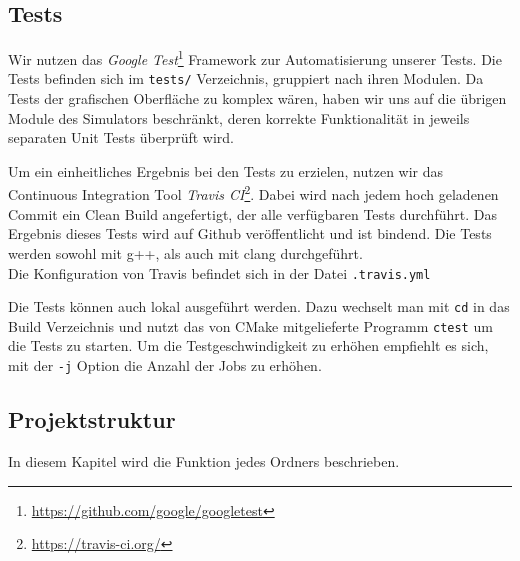 \subsection{Tests}

Wir nutzen das \emph{Google Test}\footnote{\url{https://github.com/google/googletest}} Framework
zur Automatisierung unserer Tests. Die Tests befinden sich im \texttt{tests/} Verzeichnis, gruppiert
nach ihren Modulen. Da Tests der grafischen Oberfläche zu komplex wären, haben wir uns auf die übrigen
Module des Simulators beschränkt, deren korrekte Funktionalität in jeweils separaten Unit Tests
überprüft wird.

Um ein einheitliches Ergebnis bei den Tests zu erzielen, nutzen wir das Continuous Integration Tool
\emph{Travis CI}\footnote{\url{https://travis-ci.org/}}. Dabei wird nach jedem hoch geladenen
Commit ein Clean Build angefertigt, der alle verfügbaren Tests durchführt. Das Ergebnis dieses Tests
wird auf Github veröffentlicht und ist bindend. Die Tests werden sowohl mit g++, als auch mit clang
durchgeführt. \\
Die Konfiguration von Travis befindet sich in der Datei \texttt{.travis.yml}

Die Tests können auch lokal ausgeführt werden. Dazu wechselt man mit \texttt{cd} in das Build
Verzeichnis und nutzt das von CMake mitgelieferte Programm \texttt{ctest} um die Tests zu starten.
Um die Testgeschwindigkeit zu erhöhen empfiehlt es sich, mit der \texttt{-j} Option die Anzahl
der Jobs zu erhöhen.

\subsection{Projektstruktur}

In diesem Kapitel wird die Funktion jedes Ordners beschrieben.

